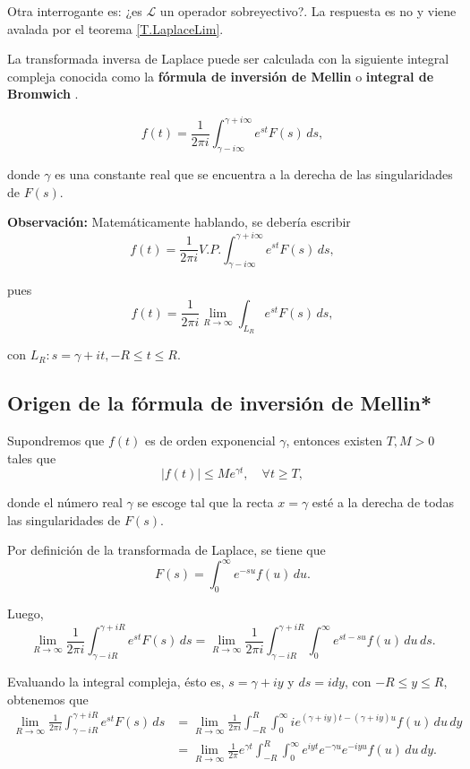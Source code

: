 Otra interrogante es: ¿es $\mathcal{L}$ un operador sobreyectivo?. La respuesta es no y viene avalada por el teorema \ref{T.LaplaceLim}.

La transformada inversa de Laplace puede ser calculada con la siguiente integral compleja conocida como la \textbf{fórmula de inversión de Mellin} o \textbf{integral de Bromwich} \cite{Arfken}.
\begin{shaded}
   $$ f(t) = \frac{1}{2\pi i} \int_{\gamma - i \infty}^{\gamma + i \infty} e^{st} F(s) \,ds,$$
\end{shaded}

donde $\gamma$ es una constante real que se encuentra a la derecha de las singularidades de $F(s)$.

\textbf{Observación:} Matemáticamente hablando, se debería escribir $$f(t) = \frac{1}{2\pi i} V.P. \int_{\gamma - i \infty}^{\gamma + i \infty} e^{st} F(s) \,ds,$$ 

pues 
$$f(t) = \frac{1}{2\pi i} \lim_{R \to \infty} \int_{L_R} e^{st} F(s) \,ds,$$ 

con $L_R: s = \gamma + it, - R\leq t \leq R$.

\subsection*{Origen de la fórmula de inversión de Mellin*}

Supondremos que $f(t)$ es de orden exponencial $\gamma$, entonces existen $T,M > 0$ tales que
$$|f(t)| \leq M e^{\gamma t}, \quad \forall t \geq T,$$

donde el número real $\gamma$ se escoge tal que la recta $x = \gamma$ esté a la derecha de todas las singularidades de $F(s)$.

Por definición de la transformada de Laplace, se tiene que
$$F(s) = \int_0^{\infty} e^{-su} f(u) \,du.$$

Luego,
$$\lim_{R \to \infty} \frac{1}{2\pi i} \int_{\gamma -i R}^{\gamma + i R} e^{st} F(s) \,ds = \lim_{R \to \infty} \frac{1}{2\pi i} \int_{\gamma -i R}^{\gamma + i R} \int_0^{\infty} e^{st-su} f(u) \,du \,ds.$$

Evaluando la integral compleja, ésto es, $s = \gamma +i y$ y $ds = i dy$, con $- R\leq y \leq R$, obtenemos que
\begin{align*}
   \lim_{R \to \infty} \frac{1}{2\pi i} \int_{\gamma -i R}^{\gamma + i R} e^{st} F(s) \,ds &=  \lim_{R \to \infty} \frac{1}{2\pi i} \int_{- R}^{R} \int_0^{\infty} i e^{(\gamma + iy)t - (\gamma + i y)u} f(u) \,du \,dy \\
   &= \lim_{R \to \infty} \frac{1}{2\pi} e^{\gamma t} \int_{- R}^{R} \int_0^{\infty} e^{i y t} e^{-\gamma u} e^{-iy u} f(u) \,du \,dy.
\end{align*}


